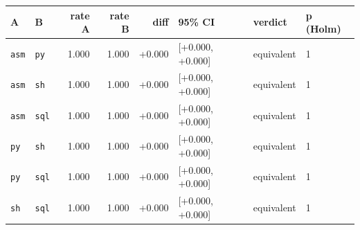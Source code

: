 \begin{tabular}{llrrrlll}
\toprule
A & B & rate A & rate B & diff & 95\% CI & verdict & p (Holm) \\
\midrule
\texttt{asm} & \texttt{py} & 1.000 & 1.000 & +0.000 & [+0.000, +0.000] & equivalent & 1 \\
\texttt{asm} & \texttt{sh} & 1.000 & 1.000 & +0.000 & [+0.000, +0.000] & equivalent & 1 \\
\texttt{asm} & \texttt{sql} & 1.000 & 1.000 & +0.000 & [+0.000, +0.000] & equivalent & 1 \\
\texttt{py} & \texttt{sh} & 1.000 & 1.000 & +0.000 & [+0.000, +0.000] & equivalent & 1 \\
\texttt{py} & \texttt{sql} & 1.000 & 1.000 & +0.000 & [+0.000, +0.000] & equivalent & 1 \\
\texttt{sh} & \texttt{sql} & 1.000 & 1.000 & +0.000 & [+0.000, +0.000] & equivalent & 1 \\
\bottomrule
\end{tabular}
